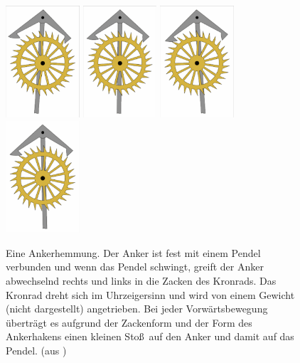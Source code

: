 \begin{figure}[htb]
\includegraphics[trim=2 2 2 2,clip,width=0.245\textwidth]{./Bilder/Anker_10.png}
\includegraphics[trim=2 2 2 2,clip,width=0.245\textwidth]{./Bilder/Anker_18.png}
\includegraphics[trim=2 2 2 2,clip,width=0.245\textwidth]{./Bilder/Anker_27.png}
\includegraphics[trim=2 2 2 2,clip,width=0.245\textwidth]{./Bilder/Anker_35.png}
\caption{\label{fig_Anker}%
Eine Ankerhemmung. Der Anker ist fest mit einem Pendel verbunden und wenn das Pendel schwingt, greift
der Anker abwechselnd rechts und links in die Zacken des Kronrads. Das Kronrad dreht sich im Uhrzeigersinn
und wird von einem Gewicht (nicht dargestellt) angetrieben. Bei jeder Vorw\"artsbewegung \"ubertr\"agt es 
aufgrund der Zackenform und der Form des Ankerhakens einen kleinen Sto\ss\ auf den Anker und damit auf
das Pendel. (aus \cite{Verge})}
\end{figure}

